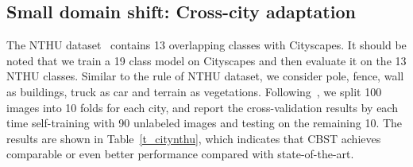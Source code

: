 \documentclass[runningheads]{llncs}
\begin{document}
\subsection{Small domain shift: Cross-city adaptation}
The NTHU dataset~\cite{Chen_2017_ICCV} contains 13 overlapping classes with Cityscapes. It should be noted that we train a 19 class model on Cityscapes and then evaluate it on the 13 NTHU classes. Similar to the rule of NTHU dataset, we consider pole, fence, wall as buildings, truck as car and terrain as vegetations. Following~\cite{Chen_2017_ICCV}, we split 100 images into 10 folds for each city, and report the cross-validation results by each time self-training with 90 unlabeled images and testing on the remaining 10. The results are shown in Table~\ref{t_citynthu}, which indicates that CBST achieves comparable or even better performance compared with state-of-the-art.
\end{document}
